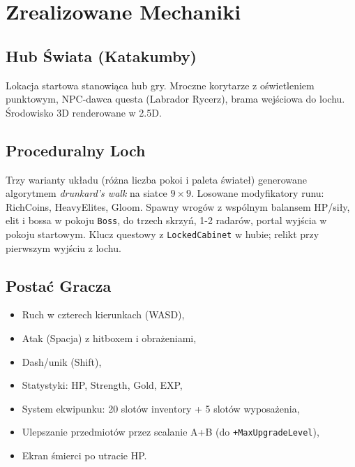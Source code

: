 \section{Zrealizowane Mechaniki}

\subsection{Hub Świata (Katakumby)}
Lokacja startowa stanowiąca hub gry. Mroczne korytarze z oświetleniem punktowym, NPC-dawca questa (Labrador Rycerz), brama wejściowa do lochu. Środowisko 3D renderowane w 2.5D.

\subsection{Proceduralny Loch}
Trzy warianty układu (różna liczba pokoi i paleta świateł) generowane algorytmem \textit{drunkard's walk} na siatce $9 \times 9$. Losowane modyfikatory runu: RichCoins, HeavyElites, Gloom. Spawny wrogów z wspólnym balansem HP/siły, elit i bossa w pokoju \texttt{Boss}, do trzech skrzyń, 1-2 radarów, portal wyjścia w pokoju startowym. Klucz questowy z \texttt{LockedCabinet} w hubie; relikt przy pierwszym wyjściu z lochu.

\subsection{Postać Gracza}
\begin{itemize}
    \item Ruch w czterech kierunkach (WASD),
    \item Atak (Spacja) z hitboxem i obrażeniami,
    \item Dash/unik (Shift),
    \item Statystyki: HP, Strength, Gold, EXP,
    \item System ekwipunku: 20 slotów inventory + 5 slotów wyposażenia,
    \item Ulepszanie przedmiotów przez scalanie A+B (do \texttt{+MaxUpgradeLevel}),
    \item Ekran śmierci po utracie HP.
\end{itemize}

